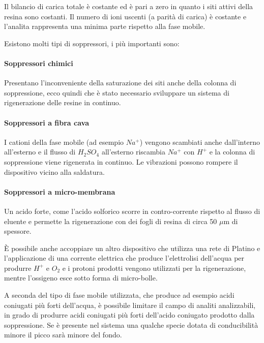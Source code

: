 Il bilancio di carica totale è costante ed è pari a zero in quanto i siti attivi della resina sono costanti. Il numero di ioni uscenti (a parità di carica) è costante e l'analita rappresenta una minima parte rispetto alla fase mobile. 

Esistono molti tipi di soppressori, i più importanti sono: 

\paragraph{Soppressori chimici}

Presentano l'inconveniente della saturazione dei siti anche della colonna di soppressione, ecco quindi che è stato necessario sviluppare un sistema di rigenerazione delle resine in continuo.

\paragraph{Soppressori a fibra cava}

I cationi della fase mobile (ad esempio $Na^+$) vengono scambiati anche dall'interno all'esterno e il flusso di $H_2SO_4$ all'esterno riscambia $Na^+$ con $H^+$ e la colonna di soppressione viene rigenerata in continuo. Le vibrazioni possono rompere il dispositivo vicino alla saldatura. 


\paragraph{Soppressori a micro-membrana}

Un acido forte, come l'acido solforico scorre in contro-corrente rispetto al flusso di eluente e permette la rigenerazione con dei fogli di resina di circa 50 $\mu$m di spessore.

È possibile anche accoppiare un altro dispositivo che utilizza una rete di Platino e l'applicazione di una corrente elettrica che produce l'elettrolisi dell'acqua per produrre $H^+$ e $O_2$ e i protoni prodotti vengono utilizzati per la rigenerazione, mentre l'ossigeno esce sotto forma di micro-bolle.


A seconda del tipo di fase mobile utilizzata, che produce ad esempio acidi coniugati più forti dell'acqua, è possibile limitare il campo di analiti analizzabili, in grado di produrre acidi coniugati più forti dell'acido coniugato prodotto dalla soppressione. Se è presente nel sistema una qualche specie dotata di conducibilità minore il picco sarà minore del fondo.

